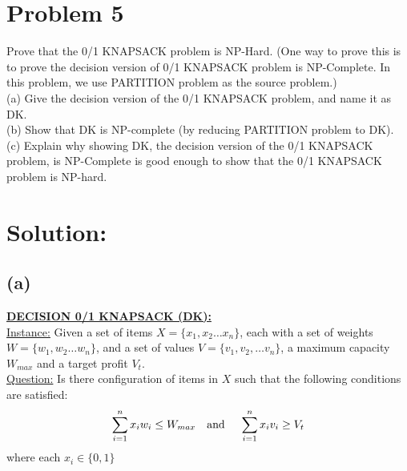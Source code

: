 
\section*{Problem 5}
	Prove that the 0/1 KNAPSACK problem is NP-Hard. 
	(One way to prove this is to prove the decision version of 0/1 KNAPSACK problem is NP-Complete.
	In this problem, we use PARTITION problem as the source problem.)\\
	
	\noindent
	(a) Give the decision version of the 0/1 KNAPSACK problem, and name it as DK.\\
	(b) Show that DK is NP-complete (by reducing PARTITION problem to DK).\\
	(c) Explain why showing DK, the decision version of the 0/1 KNAPSACK problem, is
	NP-Complete is good enough to show that the 0/1 KNAPSACK problem is NP-hard.
\vspace{-0.25cm}
\section*{Solution:}
	\subsection*{(a)}
		\underline{\textbf{DECISION 0/1 KNAPSACK (DK):}}\\
		
		\noindent
		\underline{Instance:} Given a set of items $X=\{x_1, x_2 \dots x_n\}$, each with a set of weights $W = \{w_1, w_2 \dots w_n\}$, and a set of values $V = \{v_1, v_2, \dots v_n\}$, a maximum capacity $W_{max}$ and a target profit $V_t$.\\
		
		\noindent
		\underline{Question:} Is there configuration of items in $X$ such that the following conditions are satisfied:
		\begin{equation*}
				\sum_{i=1}^{n} x_i w_i \leq W_{max} \text{\quad and \quad} \sum_{i=1}^{n} x_i v_i \geq V_t
		\end{equation*}
		where each $x_i \in\{0,1\}$
